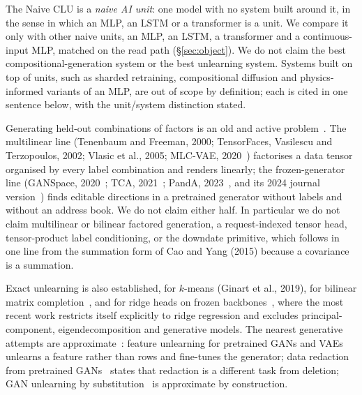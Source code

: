 \documentclass{article} %
\begin{document}
The Naive CLU is a \emph{naive AI unit}: one model with no system built around it, in the sense
in which an MLP, an LSTM or a transformer is a unit. We compare it only with other naive units, an
MLP, an LSTM, a transformer and a continuous-input MLP, matched on the read path
(\S\ref{sec:object}). We do not claim the best compositional-generation system or the best
unlearning system. Systems built on top of units, such as sharded retraining, compositional
diffusion and physics-informed variants of an MLP, are out of scope by definition; each is cited
in one sentence below, with the unit/system distinction stated.

Generating held-out combinations of factors is an old and active problem~\citep{du2020compositional,liu2022compositional}. The multilinear
line (Tenenbaum and Freeman, 2000\nocite{tenenbaum2000separating}; TensorFaces, Vasilescu and Terzopoulos, 2002\nocite{vasilescu2002tensorfaces}; Vlasic et
al., 2005\nocite{vlasic2005face}; MLC-VAE, 2020~\citep{georgopoulos2020multilinear}) factorises a data tensor organised by every label combination and
renders linearly; the frozen-generator line (GANSpace, 2020~\citep{harkonen2020ganspace}; TCA, 2021~\citep{oldfield2021tensor}; PandA, 2023~\citep{oldfield2023panda}, and its
2024 journal version~\citep{oldfield2024bilinear}) finds editable directions in a pretrained generator without labels and
without an address book. We do not claim either half. In particular we do not claim
multilinear or bilinear factored generation, a request-indexed tensor head, tensor-product
label conditioning, or the downdate primitive, which follows in one line from the summation
form of Cao and Yang (2015)\nocite{cao2015towards} because a covariance is a summation.

Exact unlearning is also established, for $k$-means (Ginart et al., 2019\nocite{ginart2019making}), for bilinear
matrix completion~\citep{xu2023netflix}, and for ridge heads on frozen backbones~\citep{quan2026exact}, where the most recent work
restricts itself explicitly to ridge regression and excludes principal-component,
eigendecomposition and generative models. The nearest generative attempts are approximate~\citep{kong2022approximate}:
feature unlearning for pretrained GANs and VAEs~\citep{moon2024feature} unlearns a feature rather than rows and
fine-tunes the generator; data redaction from pretrained GANs~\citep{kong2023data} states that redaction is a
different task from deletion; GAN unlearning by substitution~\citep{sun2025generative} is approximate by construction.
\end{document}
